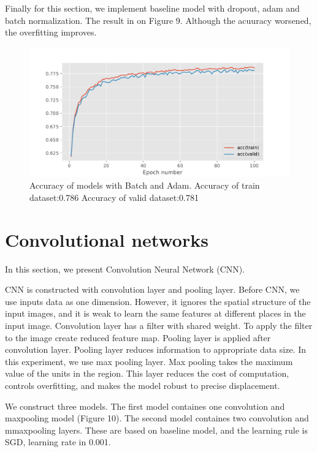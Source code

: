 \documentclass{article}
\begin{document}
Finally for this section, we implement baseline model with dropout, adam and batch normalization.
The result in on Figure 9. Although the acuuracy worsened, the overfitting improves.

\begin{figure}[h]
\vskip 5mm
\begin{center}
\centerline{\includegraphics[width=\columnwidth]{i.pdf}}
\caption{Accuracy of models with Batch and Adam. \n
Accuracy of train dataset:0.786 \n
Accuracy of valid dataset:0.781
}
\end{center}
\vskip -5mm
\end{figure}


\section{Convolutional networks}
In this section, we present Convolution Neural Network (CNN).

CNN is constructed with convolution layer and pooling layer.
Before CNN, we use inputs data as one dimension. However, it ignores the spatial structure of the input images, and it is weak to learn the same features at different places in the input image.
Convolution layer has a filter with shared weight. To apply the filter to the image create reduced feature map.
Pooling layer is applied after convolution layer. Pooling layer reduces information to appropriate data size. In this experiment, we use max pooling layer. Max pooling takes the maximum value of the units in the region. This layer reduces the cost of computation, controls overfitting, and makes the model robust to precise displacement.

We construct three models. The first model containes one convolution and maxpooling model (Figure 10). The second model containes two convolution and mmaxpooling layers. These are based on baseline model, and the learning rule is SGD, learning rate in 0.001.
\end{document}
